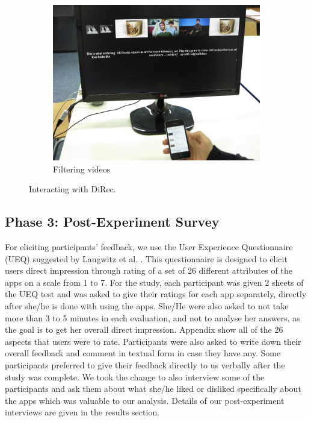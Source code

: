 \begin{figure}
    \begin{subfigure}[b]{0.3\textwidth}
        \includegraphics[width=\textwidth]{figures/IMG_6810}
        \caption{Filtering videos}
        \label{fig:figure52c}
    \end{subfigure}
   \caption{Interacting with DiRec.}\label{fig:figure52}
\end{figure}
 
\subsection{Phase 3: Post-Experiment Survey}
For eliciting participants' feedback, we use the User Experience Questionnaire
(UEQ) suggested by Laugwitz et al.
\cite{laugwitz2008construction}. This questionnaire is designed to elicit users
direct impression through rating of a set of 26 different attributes of the
apps on a scale from 1 to 7. For the study, each participant was given 2
sheets of the UEQ test and was asked to give their ratings for each app
separately, directly after she/he is done with using the apps. She/He were also
asked to not take more than 3 to 5 minutes in each evaluation, and not to analyse her
answers, as the goal is to get her overall direct impression. Appendix
show all of the 26 aspects that users were to rate. Participants were also asked
to write down their overall feedback and comment in textual form in case they
have any. Some participants preferred to give their feedback directly to us
verbally after the study was complete. We took the change to also interview some
of the participants and ask them about what she/he liked or disliked
specifically about the apps which was valuable to our analysis. Details of our
post-experiment interviews are given in the results section.

